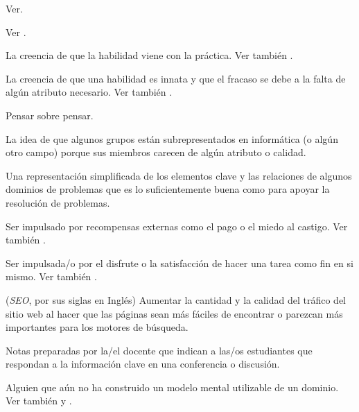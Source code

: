 \begin{description}
 Ver.

 Ver .

 La creencia de que la habilidad 
viene con la práctica. Ver también .

 La creencia de que una habilidad es innata y que 
el fracaso se debe a la falta de algún atributo necesario. Ver también
.

 Pensar sobre pensar.

 La idea de que algunos grupos 
están subrepresentados en informática (o algún otro campo) porque sus miembros 
carecen de algún atributo o calidad.

 Una representación simplificada 
de los elementos clave y las relaciones de algunos dominios de problemas que es 
lo suficientemente buena como para apoyar la resolución de problemas.

 Ser impulsado por 
recompensas externas como el pago o el miedo al castigo. Ver
también .

 Ser impulsada/o por el disfrute o 
la satisfacción de hacer una tarea como fin en si mismo.  Ver también
.

 (\emph{SEO}, por sus siglas en Inglés)  Aumentar la cantidad y la calidad del tráfico del sitio web al hacer que las páginas sean más fáciles de encontrar o parezcan más importantes para los motores de búsqueda.

 Notas preparadas por la/el docente que indican a las/os estudiantes que respondan a la información clave en una conferencia o discusión.

 Alguien que aún no ha construido un modelo mental utilizable de un dominio. Ver también  y .


\end{description}
